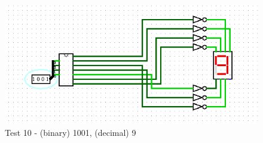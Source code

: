 \begin{figure}[h]
    \centering
    \includegraphics[width=\linewidth]{ScreenshotsTests/Comp 1/Comp 1_00000.png}
    \caption{Test 10 - (binary) 1001, (decimal) 9}
    \label{fig:test9}
\end{figure}

